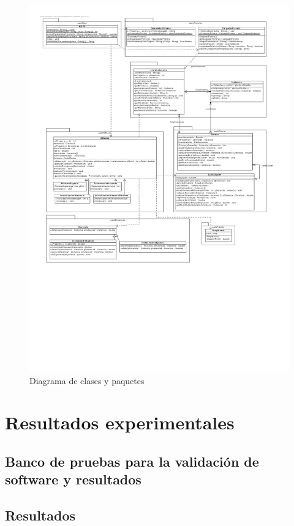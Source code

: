 \documentclass[a4paper]{report}
\begin{document}
\begin{figure}[!h]
	\centering
	\includegraphics[width=1.1\textwidth, clip=true,trim=1cm 8cm 1.2cm 1cm]{./Figuras/clases.pdf}
	\caption{Diagrama de clases y paquetes}
	\label{fig:clases}
\end{figure}

\chapter{Resultados experimentales}

	\section{Banco de pruebas para la validación de software y resultados}
	
	\section{Resultados}
	
\end{document}

